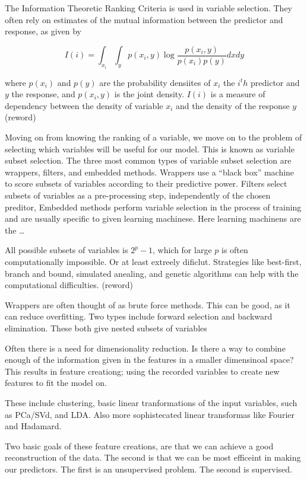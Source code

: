 \documentclass[12pt,twoside]{reedthesis}
\theoremstyle{definition}
\theoremstyle{definition}
\theoremstyle{definition}
\theoremstyle{remark}
\begin{document}
The Information Theoretic Ranking Criteria is used in variable
selection. They often rely on estimates of the mutual information
between the predictor and response, as given by

\[ I(i) = \int_{x_i}\int_yp(x_i,y)\log\frac{p(x_i,y)}{p(x_i)p(y)}dxdy\]

where \(p(x_i)\) and \(p(y)\) are the probability densiites of \(x_i\)
the \(i^th\) predictor and \(y\) the response, and \(p(x_i,y)\) is the
joint density. \(I(i)\) is a measure of dependency between the density
of variable \(x_i\) and the density of the response \(y\) (reword)

Moving on from knowing the ranking of a variable, we move on to the
problem of selecting which variables will be useful for our model. This
is known as variable subset selection. The three most common types of
variable subset selection are wrappers, filters, and embedded methods.
Wrappers use a ``black box'' machine to score subsets of variables
according to their predictive power. Filters select subsets of variables
as a pre-processing step, independently of the chosen preditor, Embedded
methods perform variable selection in the process of training and are
usually specific to given learning machinese. Here learning machinens
are the \ldots{}

All possible subsets of variables is \(2^p-1\), which for large \(p\) is
often computationally impossible. Or at least extreely dificlut.
Strategies like best-first, branch and bound, simulated anealing, and
genetic algorithms can help with the computational difficulties.
(reword)

Wrappers are often thought of as brute force methods. This can be good,
as it can reduce overfitting. Two types include forward selection and
backward elimination. These both give nested subsets of variables

Often there is a need for dimensionality reduction. Is there a way to
combine enough of the information given in the features in a smaller
dimensinoal space? This results in feature creationg; using the recorded
variables to create new features to fit the model on.

These include clustering, basic linear tranformations of the input
variables, such as PCa/SVd, and LDA. Also more sophistecated linear
transformas like Fourier and Hadamard.

Two basic goals of these feature creations, are that we can achieve a
good reconstruction of the data. The second is that we can be most
efficeint in making our predictors. The first is an unsupervised
problem. The second is supervised.
\end{document}
